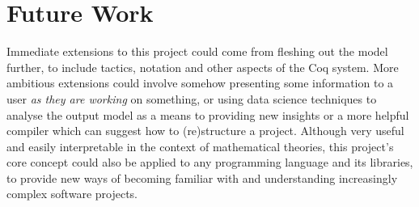 \section{Future Work}

Immediate extensions to this project could come from fleshing out the model
further, to include tactics, notation and other aspects of the Coq system.
More ambitious extensions could involve somehow presenting some information
to a user \emph{as they are working} on something, or using data science
techniques to analyse the output model as a means to providing new insights or
a more helpful compiler which can suggest how to (re)structure a project.
Although very useful and easily interpretable in the context of mathematical
theories, this project's core concept could also be applied to any programming
language and its libraries, to provide new ways of becoming familiar with and
understanding increasingly complex software projects.
